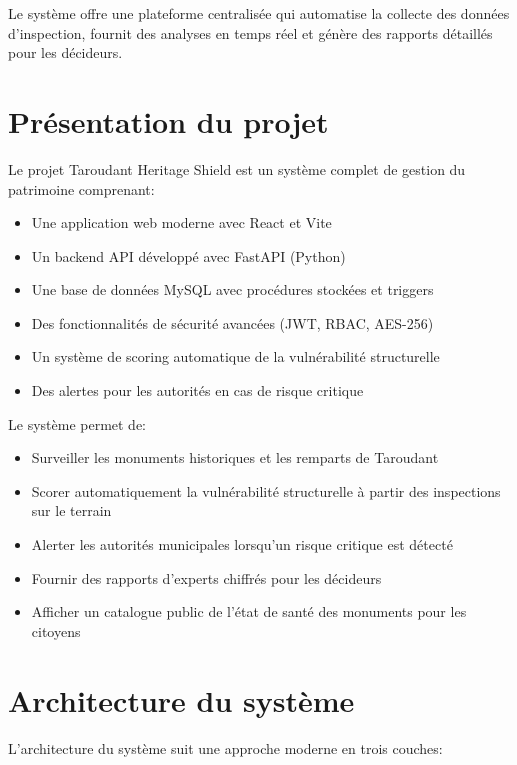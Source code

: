 \documentclass[12pt,a4paper]{article}
\begin{document}
Le système offre une plateforme centralisée qui automatise la collecte des données d'inspection, fournit des analyses en temps réel et génère des rapports détaillés pour les décideurs.

\section{Présentation du projet}

Le projet Taroudant Heritage Shield est un système complet de gestion du patrimoine comprenant:

\begin{itemize}
    \item Une application web moderne avec React et Vite
    \item Un backend API développé avec FastAPI (Python)
    \item Une base de données MySQL avec procédures stockées et triggers
    \item Des fonctionnalités de sécurité avancées (JWT, RBAC, AES-256)
    \item Un système de scoring automatique de la vulnérabilité structurelle
    \item Des alertes pour les autorités en cas de risque critique
\end{itemize}

Le système permet de:
\begin{itemize}
    \item Surveiller les monuments historiques et les remparts de Taroudant
    \item Scorer automatiquement la vulnérabilité structurelle à partir des inspections sur le terrain
    \item Alerter les autorités municipales lorsqu'un risque critique est détecté
    \item Fournir des rapports d'experts chiffrés pour les décideurs
    \item Afficher un catalogue public de l'état de santé des monuments pour les citoyens
\end{itemize}

\section{Architecture du système}

L'architecture du système suit une approche moderne en trois couches:
\end{document}
